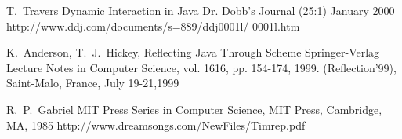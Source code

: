 \documentclass{acm-final/sig-alternate-modified}
\begin{document}
\begin{thebibliography}{1}
T.~Travers
\newblock Dynamic Interaction in Java
\newblock Dr. Dobb's Journal (25:1) January 2000
\newblock http://www.ddj.com/documents/s=889/ddj0001l/ 0001l.htm

K.~Anderson, T.~J.~Hickey,
\newblock Reflecting Java Through Scheme
\newblock Springer-Verlag Lecture Notes in Computer Science, vol. 1616, pp. 154-174, 1999.
\newblock (Reflection'99), Saint-Malo, France, July 19-21,1999

R.~P.~Gabriel
\newblock MIT Press Series in Computer Science, MIT Press, Cambridge, MA, 1985
\newblock http://www.dreamsongs.com/NewFiles/Timrep.pdf

\end{thebibliography}
\end{document}
